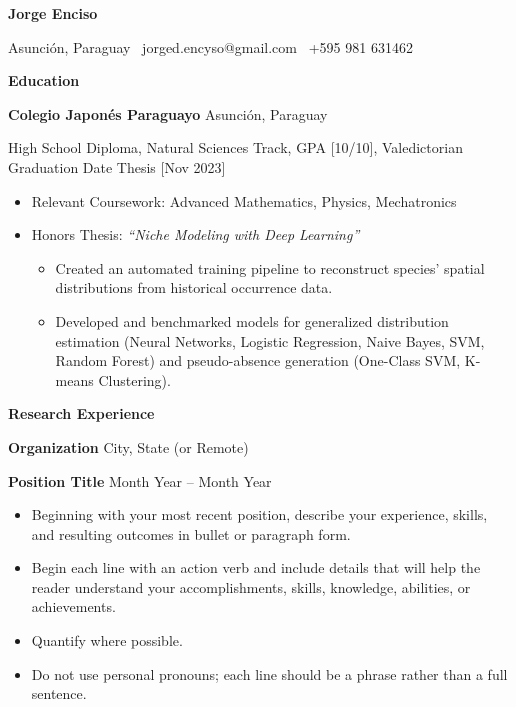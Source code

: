 \documentclass[11pt]{article}
\begin{document}
\begin{center}
    \textbf{Jorge Enciso}\\
    \hrulefill
\end{center}

\begin{center}
    Asunción, Paraguay \textbullet \ jorged.encyso@gmail.com \textbullet \ +595 981 631462
\end{center}

\vspace{0.5pt}

\begin{center}
    \textbf{Education}
\end{center}
\textbf{Colegio Japonés Paraguayo} \hfill Asunción, Paraguay

High School Diploma, Natural Sciences Track, GPA [10/10], Valedictorian \hfill Graduation Date Thesis [Nov 2023]

\begin{itemize}%
    \item Relevant Coursework: Advanced Mathematics, Physics, Mechatronics
    \item Honors Thesis: \textit{“Niche Modeling with Deep Learning”}
        \begin{itemize}
            \item Created an automated training pipeline to reconstruct species’ spatial distributions from historical occurrence data.
            \item Developed and benchmarked models for generalized distribution estimation (Neural Networks, Logistic Regression, Naive Bayes, SVM, Random Forest) and pseudo-absence generation (One-Class SVM, K-means Clustering).
        \end{itemize}
\end{itemize}

\vspace{12pt}

\begin{center}
    \textbf{Research Experience}
\end{center}
\textbf{Organization} \hfill City, State (or Remote)

\textbf{Position Title} \hfill Month Year – Month Year
\begin{itemize}[noitemsep, topsep=0pt, partopsep=0pt, parsep=0pt]
    \item Beginning with your most recent position, describe your experience, skills, and resulting outcomes in bullet or paragraph form.
    \item Begin each line with an action verb and include details that will help the reader understand your accomplishments, skills, knowledge, abilities, or achievements.
    \item Quantify where possible.
    \item Do not use personal pronouns; each line should be a phrase rather than a full sentence.
\end{itemize}
\end{document}
